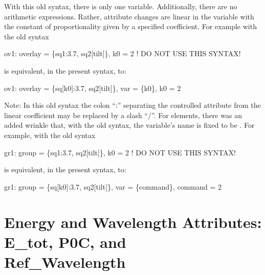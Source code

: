 With this old syntax, there is only one variable. Additionally, there are no arithmetic
expressions. Rather, attribute changes are linear in the  variable with the constant of
proportionality given by a specified coefficient. For example with the old syntax
\begin{example}
  ov1: overlay = \{sq1:3.7, sq2[tilt]\}, k0 = 2  ! DO NOT USE THIS SYNTAX!
\end{example}
is equivalent, in the present syntax, to:
\begin{example}
  ov1: overlay = \{sq[k0]:3.7, sq2[tilt]\}, var = \{k0\}, k0 = 2  
\end{example}
Note: In this old syntax the colon ``:'' separating the controlled attribute from the linear
coefficient may be replaced by a slash ``/''.  For  elements, there was an added wrinkle
that, with the old syntax, the variable's name is fixed to be . For example, with the
old syntax
\begin{example}
  gr1: group = \{sq1:3.7, sq2[tilt]\}, k0 = 2  ! DO NOT USE THIS SYNTAX!
\end{example}
is equivalent, in the present syntax, to:
\begin{example}
  gr1: group = \{sq[k0]:3.7, sq2[tilt]\}, var = \{command\}, command = 2  
\end{example}

\section[Energy and Wavelength Attributes]{Energy and Wavelength Attributes: E_tot, P0C, and \\ Ref_Wavelength}
\label{s:energy}

